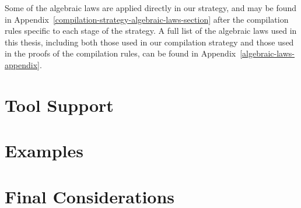 Some of the algebraic laws are applied directly in our strategy, and
may be found in
Appendix~\ref{compilation-strategy-algebraic-laws-section} after the
compilation rules specific to each stage of the strategy.
A full list of the algebraic laws used in this thesis, including both
those used in our compilation strategy and those used in the proofs of
the compilation rules, can be found in
Appendix~\ref{algebraic-laws-appendix}.


\section{Tool Support}
\label{tool-support-section}


\section{Examples}
\label{examples-section}


\section{Final Considerations}
\label{evaluation-final-considerations-section}